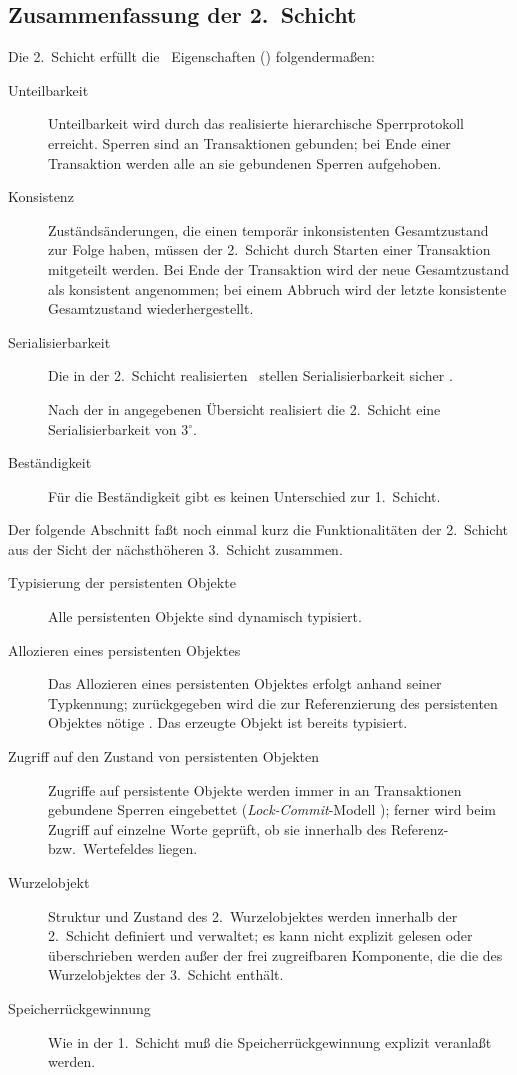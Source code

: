 \subsection{Zusammenfassung der 2.\ Schicht}
%
Die 2.~Schicht erf\"{u}llt die \acid\ Eigenschaften
(\citepage{\pageref{ref:acid}}) folgenderma\ss{}en:
\begin{description}%
%
\item[Unteilbarkeit]
Unteilbarkeit wird durch das realisierte hierarchische Sperrprotokoll
erreicht. Sperren sind an Transaktionen gebunden; bei Ende einer
Transaktion werden alle an sie gebundenen Sperren aufgehoben.
%
\item[Konsistenz]
Zust\"{a}nds\"{a}nderungen, die einen tempor\"{a}r inkonsistenten Gesamtzustand
zur Folge haben, m\"{u}ssen der 2.~Schicht durch Starten einer
Transaktion mitgeteilt werden. Bei Ende der Transaktion wird der neue
Gesamtzustand als konsistent angenommen; bei einem Abbruch wird der
letzte konsistente Gesamtzustand wiederhergestellt.
%
\item[Serialisierbarkeit]
Die in der 2.~Schicht realisierten \twophasetrs\ stellen
Serialisierbarkeit sicher \cite[]{bib:je87}.
%
\par{}Nach der in \cite[]{bib:gr93} angegebenen
\"{U}bersicht realisiert die 2.~Schicht eine Serialisierbarkeit von
3$^{\circ}$.
%
\item[Best\"{a}ndigkeit]
F\"{u}r die Best\"{a}ndigkeit gibt es keinen Unterschied zur 1.~Schicht.
%
\end{description}%
%
Der folgende Abschnitt fa\ss{}t noch einmal kurz die Funktionalit\"{a}ten
der 2.~Schicht aus der Sicht der n\"{a}chsth\"{o}heren 3.~Schicht zusammen.
\begin{description}
%
\item[Typisierung der persistenten Objekte]
Alle persistenten Objekte sind dynamisch typisiert.
%
\item[Allozieren eines persistenten Objektes]
Das Allozieren eines persistenten Objektes erfolgt anhand seiner
Typkennung; zur\"{u}ckgegeben wird die zur Referenzierung des
persistenten Objektes n\"{o}tige \sobjid. Das erzeugte Objekt ist
bereits typisiert.
%
\item[Zugriff auf den Zustand von persistenten Objekten]
Zugriffe auf persistente Objekte werden immer in an Transaktionen
gebundene Sperren eingebettet ({\em Lock-Commit\/}-Modell
\cite[]{bib:ca88}); ferner wird beim Zugriff auf einzelne
Worte gepr\"{u}ft, ob sie innerhalb des Referenz- bzw.\ Wertefeldes
liegen.
%
\item[Wurzelobjekt]
Struktur und Zustand des 2.~Wurzelobjektes werden innerhalb der
2.~Schicht definiert und verwaltet; es kann nicht explizit gelesen
oder \"{u}berschrieben werden au\ss{}er der frei zugreifbaren Komponente,
die die \sobjid\/ des Wurzelobjektes der 3.~Schicht ent\-h\"{a}lt.
%
\item[Speicherr\"{u}ckgewinnung]
Wie in der 1.~Schicht mu\ss{} die Speicherr\"{u}ckgewinnung explizit
veranla\ss{}t werden.
%
\end{description}
%
